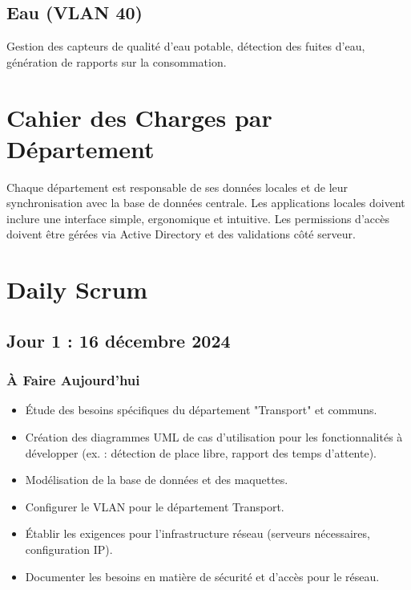 \documentclass[a4paper,12pt]{report}
\begin{document}
\section{Eau (VLAN 40)}
Gestion des capteurs de qualité d'eau potable, détection des fuites d'eau, génération de rapports sur la consommation.

\chapter{Cahier des Charges par Département}
Chaque département est responsable de ses données locales et de leur synchronisation avec la base de données centrale. Les applications locales doivent inclure une interface simple, ergonomique et intuitive. Les permissions d'accès doivent être gérées via Active Directory et des validations côté serveur.

\chapter{Daily Scrum}

\section{Jour 1 : 16 décembre 2024}

\subsection{À Faire Aujourd'hui}
\begin{itemize}
    \item Étude des besoins spécifiques du département "Transport" et communs.
    \item Création des diagrammes UML de cas d'utilisation pour les fonctionnalités à développer (ex. : détection de place libre, rapport des temps d'attente).
    \item Modélisation de la base de données et des maquettes.
    \item Configurer le VLAN pour le département Transport.
    \item Établir les exigences pour l'infrastructure réseau (serveurs nécessaires, configuration IP).
    \item Documenter les besoins en matière de sécurité et d'accès pour le réseau.
\end{itemize}
\end{document}
